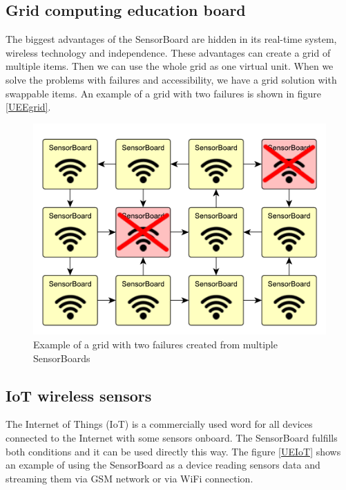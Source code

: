 \subsection{Grid computing education board}
\label{ExampleGrid}
The biggest advantages of the SensorBoard are hidden in its real-time system, wireless technology and independence. These advantages can create a grid of multiple items. Then we can use the whole grid as one virtual unit. When we solve the problems with failures and accessibility, we have a grid solution with swappable items. An example of a grid with two failures is shown in figure \ref{UEEgrid}.

\begin{figure}[H]
	\centering
	\label{UEgrid}
	\caption{Example of a grid with two failures created from multiple SensorBoards}
	\includegraphics[width=16cm]{img/UsageExamplesGrid.pdf}
\end{figure}

\subsection{IoT wireless sensors}
The Internet of Things (IoT) is a commercially used word for all devices connected to the Internet with some sensors onboard. The SensorBoard fulfills both conditions and it can be used directly this way. The figure \ref{UEIoT} shows an example of using the SensorBoard as a device reading sensors data and streaming them via GSM network or via WiFi connection.

